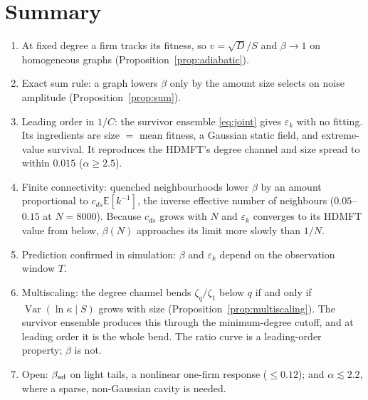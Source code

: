 \documentclass[11pt]{article}
\newcommand{\E}{\mathbb E}
\newcommand{\Var}{\operatorname{Var}}
\theoremstyle{remark}
\begin{document}
\section*{Summary}
\begin{enumerate}
  \item At fixed degree a firm tracks its fitness, so $v=\sqrt D/S$ and $\beta\to1$ on
        homogeneous graphs (Proposition~\ref{prop:adiabatic}).
  \item Exact sum rule: a graph lowers $\beta$ only by the amount size selects on noise
        amplitude (Proposition~\ref{prop:sum}).
  \item Leading order in $1/C$: the survivor ensemble \eqref{eq:joint} gives $\varepsilon_k$ with
        no fitting.  Its ingredients are size $=$ mean fitness, a Gaussian static field, and
        extreme-value survival.  It reproduces the HDMFT's degree channel and size spread to
        within $0.015$ ($\alpha\ge2.5$).
  \item Finite connectivity: quenched neighbourhoods lower $\beta$ by an amount proportional
        to $c_{ds}\E[k^{-1}]$, the inverse effective number of neighbours ($0.05$--$0.15$ at
        $N=8000$).  Because $c_{ds}$ grows with $N$ and $\varepsilon_k$ converges to its HDMFT
        value from below, $\beta(N)$ approaches its limit more slowly than $1/N$.
  \item Prediction confirmed in simulation: $\beta$ and $\varepsilon_k$ depend on the observation
        window $T$.
  \item Multiscaling: the degree channel bends $\zeta_q/\zeta_1$ below $q$ if and only if
        $\Var(\ln\kappa\mid S)$ grows with size (Proposition~\ref{prop:multiscaling}).  The
        survivor ensemble produces this through the minimum-degree cutoff, and at leading order it
        is the whole bend.  The ratio curve is a leading-order property; $\beta$ is not.
  \item Open: $\beta_{\rm ad}$ on light tails, a nonlinear one-firm response ($\le0.12$); and
        $\alpha\lesssim2.2$, where a sparse, non-Gaussian cavity is needed.
\end{enumerate}
\end{document}
